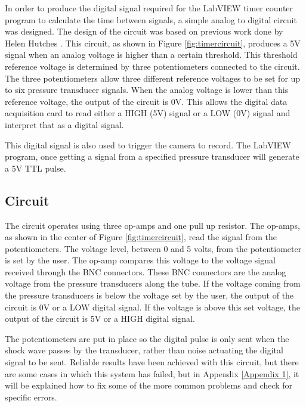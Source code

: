 In order to produce the digital signal required for the LabVIEW timer counter program to calculate the time between signals, a simple analog to digital circuit was designed. The design of the circuit was based on previous work done by Helen Hutches \cite{Hutchens2015}. This circuit, as shown in Figure \ref{fig:timercircuit}, produces a 5V signal when an analog voltage is higher than a certain threshold. This threshold reference voltage is determined by three potentiometers connected to the circuit. The three potentiometers allow three different reference voltages to be set for up to six pressure transducer signals. When the analog voltage is lower than this reference voltage, the output of the circuit is 0V. This allows the digital data acquisition card to read either a HIGH (5V) signal or a LOW (0V) signal and interpret that as a digital signal. 

This digital signal is also used to trigger the camera to record. The LabVIEW program, once getting a signal from a specified pressure transducer will generate a 5V TTL pulse. 


\subsection{Circuit}
The circuit operates using three op-amps and one pull up resistor. The op-amps, as shown in the center of Figure \ref{fig:timercircuit}, read the signal from the potentiometers. The voltage level, between 0 and 5 volts, from the potentiometer is set by the user. The op-amp compares this voltage to the voltage signal received through the BNC connectors. These BNC connectors are the analog voltage from the pressure transducers along the tube. If the voltage coming from the pressure transducers is below the voltage set by the user, the output of the circuit is 0V or a LOW digital signal. If the voltage is above this set voltage, the output of the circuit is 5V or a HIGH digital signal. 

The potentiometers are put in place so the digital pulse is only sent when the shock wave passes by the transducer, rather than noise actuating the digital signal to be sent. Reliable results have been achieved with this circuit, but there are some cases in which this system has failed, but in Appendix \ref{Appendix 1}, it will be explained how to fix some of the more common problems and check for specific errors.


